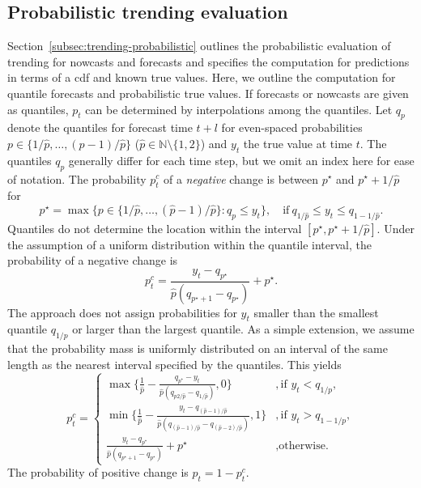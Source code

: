 \documentclass[pdflatex]{sn-jnl}
\theoremstyle{plain}%
\theoremstyle{definition}
\newcommand{\N}{\mathbb{N}}
\newcommand{\pmax}{\hat{p}} %
\newcommand{\pc}{p^c}
\begin{document}
\subsection{Probabilistic trending evaluation}\label{subsec:app-probabilistic-trending-evaluation}

Section~\ref{subsec:trending-probabilistic} outlines the probabilistic evaluation of trending for nowcasts and forecasts and specifies the computation for predictions in terms of a \ac{cdf} and known true values.
Here, we outline the computation for quantile forecasts and probabilistic true values.
If forecasts or nowcasts are given as quantiles, $p_t$ can be determined by interpolations among the quantiles.
Let $q_p$ denote the quantiles for forecast time $t+l$ for even-spaced probabilities $p \in \{1/\pmax, \dots, (p-1) / \pmax\}$ ($\pmax \in \N \setminus \{1, 2\}$) and $y_t$ the true value at time $t$.
The quantiles $q_p$ generally differ for each time step, but we omit an index here for ease of notation.
The probability $\pc_t$ of a \textit{negative} change is between $p^{\star}$ and $p^{\star} + 1/\pmax$ for
\begin{equation*}
    p^{\star} = \max \{p \in \{1/\pmax, \dots, (\pmax-1) / \pmax\}: q_p \leq y_t\} , \quad \text{if}\ q_{1/\pmax} \leq y_t \leq q_{1 - 1/\pmax}.
\end{equation*}
Quantiles do not determine the location within the interval $[p^{\star}, p^{\star} + 1/\pmax]$.
Under the assumption of a uniform distribution within the quantile interval, the probability of a negative change is
\begin{equation*}
    \pc_t = \frac{y_t - q_{p^\star}}{\pmax (q_{p^{\star} + 1} - q_{p^{\star}})} + p^{\star}.
\end{equation*}
The approach does not assign probabilities for $y_t$ smaller than the smallest quantile $q_{1/p}$ or larger than the largest quantile.
As a simple extension, we assume that the probability mass is uniformly distributed on an interval of the same length as the nearest interval specified by the quantiles.
This yields
\begin{equation*}
\pc_t = \begin{cases}
    \max \{\frac{1}{\pmax} - \frac{q_{p^\star} - y_t}{\pmax (q_{p2/\pmax} - q_{1/\pmax})}, 0\} &, \text{if } y_t < q_{1/p}, \\
    \min \{\frac{1}{\pmax} - \frac{y_t - q_{(\pmax-1)/\pmax}}{\pmax (q_{(\pmax-1)/\pmax} - q_{(\pmax-2)/\pmax})}, 1\} &, \text{if } y_t > q_{1 - 1/p}, \\
    \frac{y_t - q_{p^\star}}{\pmax (q_{p^{\star} + 1} - q_{p^{\star}})} + p^{\star} &, \text{otherwise.}
\end{cases}
\end{equation*}
The probability of positive change is $p_t = 1 - \pc_t$.
\end{document}
